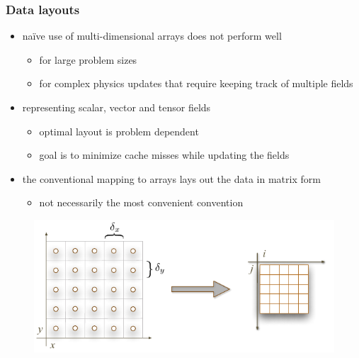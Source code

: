 \begin{frame}[fragile]
%
  \frametitle{Data layouts}
%
  \begin{itemize}
%
  \item na\"ive use of multi-dimensional arrays does not perform well
    \begin{itemize}
    \item for large problem sizes
    \item for complex physics updates that require keeping track of multiple fields
    \end{itemize}
%
  \item representing scalar, vector and tensor fields
    \begin{itemize}
    \item optimal layout is problem dependent
    \item goal is to minimize cache misses while updating the fields
    \end{itemize}
%
  \item the conventional mapping to arrays lays out the data in matrix form
    \begin{itemize}
    \item not necessarily the most convenient convention
    \end{itemize}
% 
  \end{itemize}
%
  \begin{figure}
    \includegraphics[scale=0.7]{figures/structured-coordinates.pdf}
  \end{figure} 
%
\end{frame}

